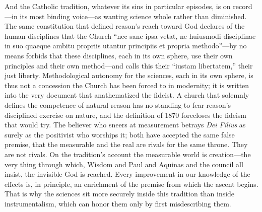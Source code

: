 And the Catholic tradition, whatever its sins in particular episodes, is on record---in its most binding voice---as wanting science whole rather than diminished. The same constitution that defined reason's reach toward God declares of the human disciplines that the Church ``nec sane ipsa vetat, ne huiusmodi disciplinae in suo quaeque ambitu propriis utantur principiis et propria methodo''---by no means forbids that these disciplines, each in its own sphere, use their own principles and their own method---and calls this their ``iustam libertatem,'' their just liberty. Methodological autonomy for the sciences, each in its own sphere, is thus not a concession the Church has been forced to in modernity; it is written into the very document that anathematized the fideist. A church that solemnly defines the competence of natural reason has no standing to fear reason's disciplined exercise on nature, and the definition of 1870 forecloses the fideism that would try. The believer who sneers at measurement betrays \emph{Dei Filius} as surely as the positivist who worships it; both have accepted the same false premise, that the measurable and the real are rivals for the same throne. They are not rivals. On the tradition's account the measurable world is creation---the very thing through which, Wisdom and Paul and Aquinas and the council all insist, the invisible God is reached. Every improvement in our knowledge of the effects is, in principle, an enrichment of the premise from which the ascent begins. That is why the sciences sit more securely inside this tradition than inside instrumentalism, which can honor them only by first misdescribing them.

